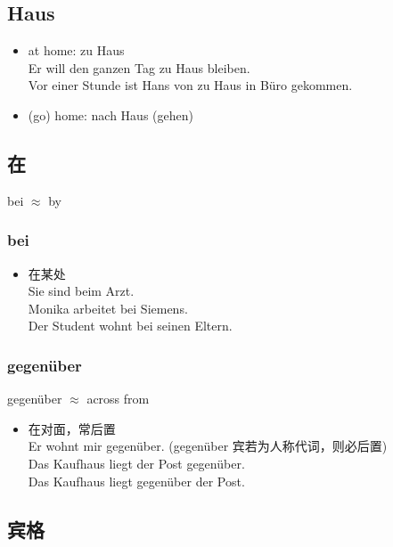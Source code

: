 \subsection{Haus}
\begin{itemize}
    \item at home: zu Haus \\
          Er will den ganzen Tag zu Haus bleiben.  \\
          Vor einer Stunde ist Hans von zu Haus in Büro gekommen.  \\
    \item (go) home: nach Haus (gehen)
\end{itemize}

\subsection{在}
bei $\approx$ by
\subsubsection{bei \olive[border=true]}
\begin{itemize}
    \item 在某处 \\
          Sie sind beim Arzt. \\
          Monika arbeitet bei Siemens. \\
          Der Student wohnt bei seinen Eltern. 
\end{itemize}
\subsubsection{gegenüber \olive[border=true]}
gegenüber $\approx$ across from
\begin{itemize}
    \item 在对面，常后置 \\
          Er wohnt mir gegenüber. (gegenüber 宾若为人称代词，则必后置) \\
          Das Kaufhaus liegt der Post gegenüber. \\
          Das Kaufhaus liegt gegenüber der Post. \\
\end{itemize}

\subsection{宾格}
